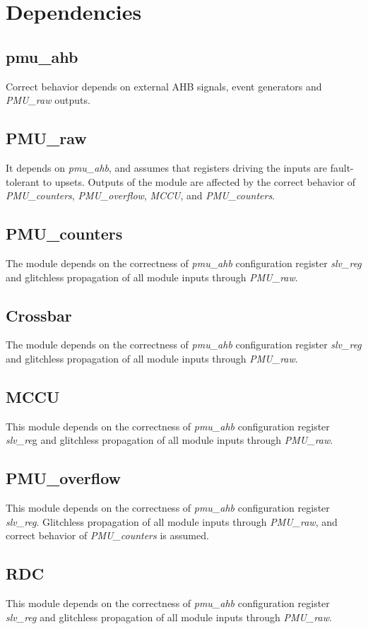 \newpage
\section{Dependencies}
\label{chapter3}
\subsection{pmu\_ahb}
Correct behavior depends on external AHB signals, event generators and \textit{PMU\_raw} outputs.
\subsection{PMU\_raw}
It depends on \textit{pmu\_ahb}, and assumes that registers driving the inputs are fault-tolerant to upsets. Outputs of the module are affected by the correct behavior of \textit{PMU\_counters}, \textit{PMU\_overflow}, \textit{MCCU}, and\textit{ PMU\_counters}. 
\subsection{PMU\_counters}
The module depends on the correctness of \textit{pmu\_ahb} configuration register \textit{slv\_reg} and glitchless propagation of all module inputs through\textit{ PMU\_raw}. 
\subsection{Crossbar}
The module depends on the correctness of \textit{pmu\_ahb} configuration register \textit{slv\_reg} and glitchless propagation of all module inputs through \textit{PMU\_raw}. 
\subsection{MCCU}
This module depends on the correctness of \textit{pmu\_ahb} configuration register \textit{slv\_re}g and glitchless propagation of all module inputs through \textit{PMU\_raw}. 
\subsection{PMU\_overflow}
This module depends on the correctness of \textit{pmu\_ahb} configuration register \textit{slv\_reg}. Glitchless propagation of all module inputs through \textit{PMU\_raw}, and correct behavior of \textit{PMU\_counters} is assumed.
\subsection{RDC}
This module depends on the correctness of \textit{pmu\_ahb} configuration register \textit{slv\_reg} and glitchless propagation of all module inputs through \textit{PMU\_raw}. 
